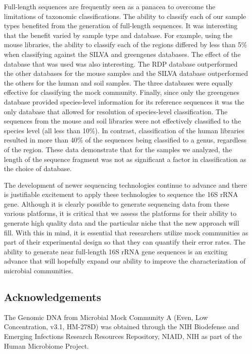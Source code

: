 \documentclass[11pt,]{article}
\begin{document}
Full-length sequences are frequently seen as a panacea to overcome the
limitations of taxonomic classifications. The ability to classify each
of our sample types benefited from the generation of full-length
sequences. It was interesting that the benefit varied by sample type and
database. For example, using the mouse libraries, the ability to
classify each of the regions differed by less than 5\% when classifying
against the SILVA and greengenes databases. The effect of the database
that was used was also interesting. The RDP database outperformed the
other databases for the mouse samples and the SILVA database
outperformed the others for the human and soil samples. The three
databases were equally effective for classifying the mock community.
Finally, since only the greengenes database provided species-level
information for its reference sequences it was the only database that
allowed for resolution of species-level classification. The sequences
from the mouse and soil libraries were not effectively classified to the
species level (all less than 10\%). In contrast, classification of the
human libraries resulted in more than 40\% of the sequences being
classified to a genus, regardless of the region. These data demonstrate
that for the samples we analyzed, the length of the sequence fragment
was not as significant a factor in classification as the choice of
database.

The development of newer sequencing technologies continue to advance and
there is justifiable excitement to apply these technologies to sequence
the 16S rRNA gene. Although it is clearly possible to generate
sequencing data from these various platforms, it is critical that we
assess the platforms for their ability to generate high quality data and
the particular niche that the new approach will fill. With this in mind,
it is essential that researchers utilize mock communities as part of
their experimental design so that they can quantify their error rates.
The ability to generate near full-length 16S rRNA gene sequences is an
exciting advance that will hopefully expand our ability to improve the
characterization of microbial communities.

\subsection{Acknowledgements}\label{acknowledgements}

The Genomic DNA from Microbial Mock Community A (Even, Low
Concentration, v3.1, HM-278D) was obtained through the NIH Biodefense
and Emerging Infections Research Resources Repository, NIAID, NIH as
part of the Human Microbiome Project.
\end{document}
